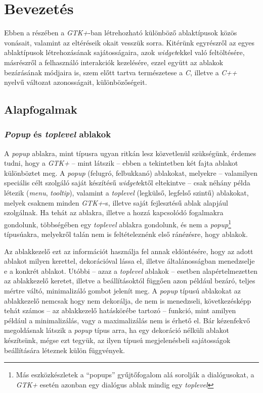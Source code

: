 \section{Bevezetés}

Ebben a részében a \textit{GTK+}-ban létrehozható különböző ablaktípusok közös vonásait, valamint az eltéréseik okait vesszük sorra. Kitérünk egyrészről az egyes ablaktípusok létrehozásának sajátosságaira, azok \textit{widget}ekkel való feltöltésére, másrészről a felhasználó interakciók kezelésére, ezzel együtt az ablakok bezárásának módjaira is, szem előtt tartva természetese a \textit{C}, illetve a \textit{C++} nyelvű változat azonosságait, különbözőségeit.

\subsection{Alapfogalmak}

\subsubsection{\textit{Popup} és \textit{toplevel} ablakok}

A \textit{popup} ablakra, mint típusra ugyan ritkán lesz közvetlenül szükségünk, érdemes tudni, hogy a \textit{GTK+} -- mint látszik -- ebben a tekintetben két fajta ablakot különböztet meg. A \textit{popup} (felugró, felbukkanó) ablakokat, melyekre -- valamilyen speciális célt szolgáló saját készítésű \textit{widget}ektől eltekintve -- csak néhány példa létezik (\textit{menu}, \textit{tooltip}), valamint a \textit{toplevel} (legkülső, legfelső szintű) ablakokat, melyek csaknem minden \textit{GTK+}-s, illetve saját fejlesztésű ablak alapjául szolgálnak. Ha tehát az ablakra, illetve a hozzá kapcsolódó fogalmakra gondolunk, többségében egy \textit{toplevel} ablakra gondolunk, és nem a \textit{popup}\footnote{Más eszközkészletek a ``popups'' gyűjtőfogalom alá sorolják a dialógusokat, a \textit{GTK+} esetén azonban egy dialógus ablak mindig egy \textit{toplevel}} típusúakra, melyekről talán nem is feltételeznénk első ránézésre, hogy ablakok.

Az ablakkezelő ezt az információt használja fel annak eldöntésére, hogy az adott ablakot milyen kerettel, dekorációval lássa el, illetve általánosságban menedzselje e a konkrét ablakot. Utóbbi -- azaz a \textit{toplevel} ablakok -- esetben alapértelmezetten az ablakkezelő keretet, illetve a beállításoktól függően azon például bezáró, teljes mértre váltó, minimalizáló gombot jelenít meg. A \textit{popup} típusú ablakokat az ablakkezelő nemcsak hogy nem dekorálja, de nem is menedzseli, következésképp tehát számos -- az ablakkezelő hatáskörébe tartozó -- funkció, mint amilyen például a minimalizálás, vagy a maximalizálás nem is érhető el. Bár kézenfekvő megoldásnak látszik a \textit{popup} típus arra, ha egy dekoráció nélküli ablakot készítsünk, mégse ezt tegyük, az ilyen típusú megjelenésbeli sajátosságok beállítására léteznek külön függvények.

